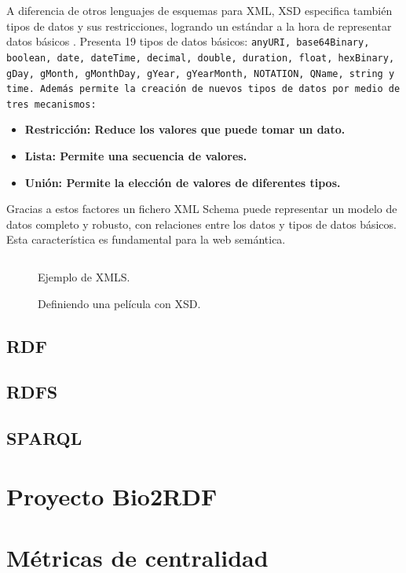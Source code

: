A diferencia de otros lenguajes de esquemas para XML, XSD especifica también
tipos de datos y sus restricciones, logrando un estándar a la hora de
representar datos básicos \cite{biron2004xml}. 
Presenta 19 tipos de datos básicos: \tt{anyURI},
\tt{base64Binary}, \tt{boolean}, \tt{date}, \tt{dateTime}, \tt{decimal},
\tt{double}, \tt{duration}, \tt{float}, \tt{hexBinary}, \tt{gDay}, \tt{gMonth},
\tt{gMonthDay}, \tt{gYear}, \tt{gYearMonth}, \tt{NOTATION}, \tt{QName},
\tt{string} y \tt{time}. Además permite la creación de nuevos tipos de datos por
medio de tres mecanismos:
\begin{itemize}
  \item \bf{Restricción:} Reduce los valores que puede tomar un dato.
  \item \bf{Lista:} Permite una secuencia de valores.
  \item \bf{Unión:} Permite la elección de valores de diferentes tipos.
\end{itemize}

Gracias a estos factores un fichero XML Schema puede representar un modelo de
datos completo y robusto, con relaciones entre los datos y tipos de datos
básicos. Esta característica es fundamental para la web semántica.

\begin{figure}[htpb]
  \centering
  \begin{tabular}{c}
    
  \end{tabular}
  \caption{Ejemplo de XMLS.}
  \vspace{-.25cm}
  \caption*{Definiendo una película con XSD.}
  \label{fig:xsdex}
\end{figure}

\subsection{RDF}
\subsection{RDFS}
\subsection{SPARQL}

\section{Proyecto Bio2RDF}\label{ea:bio}
\section{Métricas de centralidad}\label{ea:cent}

